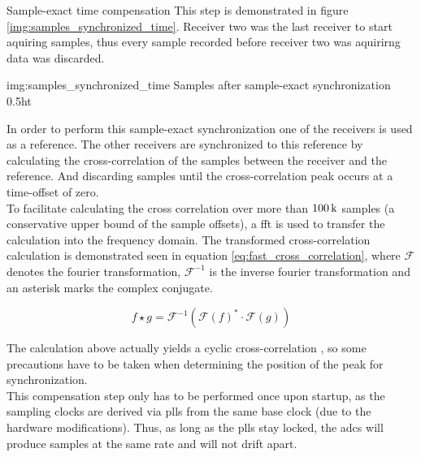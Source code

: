 \begin{subchapter}{Sample-exact time compensation}
  This step is demonstrated in figure \ref{img:samples_synchronized_time}.
  Receiver two was the last receiver to start aquiring samples,
  thus every sample recorded before receiver two was aquirirng
  data was discarded.

               {img:samples_synchronized_time}
               {Samples after sample-exact synchronization}
               {0.5}{ht}

  In order to perform this sample-exact synchronization
  one of the receivers is used as a reference.
  The other receivers are synchronized to this reference
  by calculating the cross-correlation of the samples between
  the receiver and the reference.
  And discarding samples until the cross-correlation peak
  occurs at a time-offset of zero. \\

  To facilitate calculating the cross correlation over
  more than $\SI{100}{\kilo\relax}$ samples (a conservative
  upper bound of the sample offsets), a \acrlong{fft}
  is used to transfer the calculation into the frequency domain.
  The transformed cross-correlation calculation is demonstrated
  seen in equation \ref{eq:fast_cross_correlation}, where
  $\mathcal{F}$ denotes the fourier transformation,
  $\mathcal{F}^{-1}$ is the inverse fourier transformation
  and an asterisk marks the complex conjugate.

  \begin{equation}
    \label{eq:fast_cross_correlation}
    f \star g = \mathcal{F}^{-1}\left(
      \mathcal{F}\left( f \right)^{\ast}
      \cdot
      \mathcal{F}\left( g \right)
    \right)
  \end{equation}

  The calculation above actually yields a
  cyclic cross-correlation \cite[p. 329]{kammeyer2012},
  so some precautions have to be taken when
  determining the position of the peak for
  synchronization. \\

  This compensation step only has to be performed
  once upon startup, as the sampling clocks are
  derived via \glspl{pll} from the same base clock
  (due to the hardware modifications).
  Thus, as long as the \glspl{pll} stay locked,
  the \glspl{adc} will produce samples at the
  same rate and will not drift apart.
\end{subchapter}

